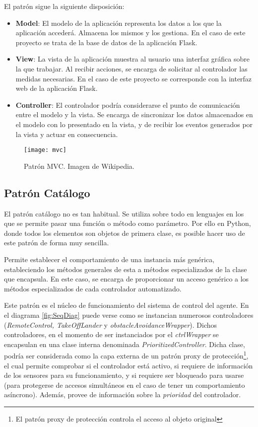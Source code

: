 El patrón sigue la siguiente disposición: 
\begin{itemize}
\item \textbf{Model}: El modelo de la aplicación representa los datos a los que la aplicación accederá. Almacena los mismos y los gestiona. En el caso de este proyecto se trata de la base de datos de la aplicación Flask.
\item \textbf{View}: La vista de la aplicación muestra al usuario una interfaz gráfica sobre la que trabajar. Al recibir acciones, se encarga de solicitar al controlador las medidas necesarias. En el caso de este proyecto se corresponde con la interfaz web de la aplicación Flask.
\item \textbf{Controller}: El controlador podría considerarse el punto de comunicación entre el modelo y la vista. Se encarga de sincronizar los datos almacenados en el modelo con lo presentado en la vista, y de recibir los eventos generados por la vista y actuar en consecuencia.
\end{itemize}

\begin{figure}[H]
	\centering
	\texttt{[image: mvc]}
	\caption{Patrón MVC. Imagen de Wikipedia.}\label{fig:mvc}
\end{figure}

\subsection{Patrón Catálogo}
\label{subsec:patternCatalog}
El patrón catálogo no es tan habitual. Se utiliza sobre todo en lenguajes en los que se permite pasar una función o método como parámetro. Por ello en Python, donde todos los elementos son objetos de primera clase, es posible hacer uso de este patrón de forma muy sencilla. 

Permite establecer el comportamiento de una instancia más genérica, estableciendo los métodos generales de esta a métodos especializados de la clase que encapsula. En este caso, se encarga de proporcionar un acceso genérico a los métodos especializados de cada controlador automatizado. 

Este patrón es el núcleo de funcionamiento del sistema de control del agente. En el diagrama \ref{fig:SeqDiag} puede verse como se instancian numerosos controladores (\textit{RemoteControl, TakeOffLander} y  \textit{obstacleAvoidanceWrapper}). Dichos controladores, en el momento de ser instanciados por el \textit{ctrlWrapper} se encapsulan en una clase interna denominada \emph{PrioritizedController}. Dicha clase, podría ser considerada como la capa externa de un patrón proxy de protección\footnote{El patrón proxy de protección controla el acceso al objeto original}, el cual permite comprobar si el controlador está activo, si requiere de información de los sensores para su funcionamiento, y si requiere ser bloqueado para usarse (para protegerse de accesos simultáneos en el caso de tener un comportamiento asíncrono). Además, provee de información sobre la \emph{prioridad} del controlador. 

